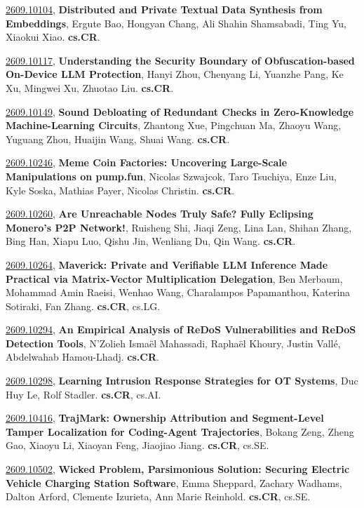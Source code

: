 \documentclass[9pt, a4paper]{article}
\theoremstyle{plain}
\theoremstyle{definition}
\theoremstyle{remark}
\newcommand{\arxivwithtarget}[3]{\hypertarget{#1}{}\href{https://arxiv.org/abs/#1}{#1}, \textbf{\textcolor{arxivblue}{#2}}, #3. }
\begin{document}
\arxivwithtarget{2609.10104}{Distributed and Private Textual Data Synthesis from Embeddings}{Ergute Bao, Hongyan Chang, Ali Shahin Shamsabadi, Ting Yu, Xiaokui Xiao}\textbf{cs.CR}.



\arxivwithtarget{2609.10117}{Understanding the Security Boundary of Obfuscation-based On-Device LLM Protection}{Hanyi Zhou, Chenyang Li, Yuanzhe Pang, Ke Xu, Mingwei Xu, Zhuotao Liu}\textbf{cs.CR}.



\arxivwithtarget{2609.10149}{Sound Debloating of Redundant Checks in Zero-Knowledge Machine-Learning Circuits}{Zhantong Xue, Pingchuan Ma, Zhaoyu Wang, Yuguang Zhou, Huaijin Wang, Shuai Wang}\textbf{cs.CR}.



\arxivwithtarget{2609.10246}{Meme Coin Factories: Uncovering Large-Scale Manipulations on pump.fun}{Nicolas Szwajcok, Taro Tsuchiya, Enze Liu, Kyle Soska, Mathias Payer, Nicolas Christin}\textbf{cs.CR}.



\arxivwithtarget{2609.10260}{Are Unreachable Nodes Truly Safe? Fully Eclipsing Monero's P2P Network!}{Ruisheng Shi, Jiaqi Zeng, Lina Lan, Shihan Zhang, Bing Han, Xiapu Luo, Qishu Jin, Wenliang Du, Qin Wang}\textbf{cs.CR}.



\arxivwithtarget{2609.10264}{Maverick: Private and Verifiable LLM Inference Made Practical via Matrix-Vector Multiplication Delegation}{Ben Merbaum, Mohammad Amin Raeisi, Wenhao Wang, Charalampos Papamanthou, Katerina Sotiraki, Fan Zhang}\textbf{cs.CR}, cs.LG.



\arxivwithtarget{2609.10294}{An Empirical Analysis of ReDoS Vulnerabilities and ReDoS Detection Tools}{N'Zolieh Ismaël Mahassadi, Raphaël Khoury, Justin Vallé, Abdelwahab Hamou-Lhadj}\textbf{cs.CR}.



\arxivwithtarget{2609.10298}{Learning Intrusion Response Strategies for OT Systems}{Duc Huy Le, Rolf Stadler}\textbf{cs.CR}, cs.AI.



\arxivwithtarget{2609.10416}{TrajMark: Ownership Attribution and Segment-Level Tamper Localization for Coding-Agent Trajectories}{Bokang Zeng, Zheng Gao, Xiaoyu Li, Xiaoyan Feng, Jiaojiao Jiang}\textbf{cs.CR}, cs.SE.



\arxivwithtarget{2609.10502}{Wicked Problem, Parsimonious Solution: Securing Electric Vehicle Charging Station Software}{Emma Sheppard, Zachary Wadhams, Dalton Arford, Clemente Izurieta, Ann Marie Reinhold}\textbf{cs.CR}, cs.SE.
\end{document}
